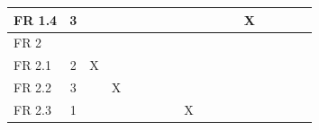 \documentclass[a4paper,12pt]{article}
\begin{document}
\begin{longtable}
{\begin{tabular}{|l|c|c|c|c|c|c|c|c|c|c|c|c|c|c|c|c|}
				FR 1.4 & 3                             &                             &                             &                             &                             &                             &                             &                             &                             &                             &                             & X                           &                             &                             &                             &                             \\ \hline
				FR 2   &                               &                             &                             &                             &                             &                             &                             &                             &                             &                             &                             &                             &                             &                             &                             &                             \\ \hline
				FR 2.1 & 2                             & X                           &                             &                             &                             &                             &                             &                             &                             &                             &                             &                             &                             &                             &                             &                             \\
				FR 2.2 & 3                             &                             & X                           &                             &                             &                             &                             &                             &                             &                             &                             &                             &                             &                             &                             &                             \\
				FR 2.3 & 1                             &                             &                             &                             &                             &                             &                             & X                           &                             &                             &                             &                             &                             &                             &                             &                             \\ \hline

\end{tabular}}
\end{longtable}
\end{document}
